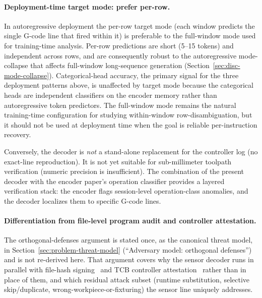 \documentclass[sensors,article,submit,moreauthors,pdftex]{Definitions/mdpi}
\begin{document}
\paragraph{Deployment-time target mode: prefer per-row.} In autoregressive deployment the per-row target mode (each window predicts the single G-code line that fired within it) is preferable to the full-window mode used for training-time analysis. Per-row predictions are short (5--15 tokens) and independent across rows, and are consequently robust to the autoregressive mode-collapse that affects full-window long-sequence generation (Section~\ref{sec:disc-mode-collapse}). Categorical-head accuracy, the primary signal for the three deployment patterns above, is unaffected by target mode because the categorical heads are independent classifiers on the encoder memory rather than autoregressive token predictors. The full-window mode remains the natural training-time configuration for studying within-window row-disambiguation, but it should not be used at deployment time when the goal is reliable per-instruction recovery.

Conversely, the decoder is \emph{not} a stand-alone replacement for the controller log (no exact-line reproduction). It is not yet suitable for sub-millimeter toolpath verification (numeric precision is insufficient). The combination of the present decoder with the encoder paper's operation classifier provides a layered verification stack: the encoder flags session-level operation-class anomalies, and the decoder localizes them to specific G-code lines.

\paragraph{Differentiation from file-level program audit and controller attestation.} The orthogonal-defenses argument is stated once, as the canonical threat model, in Section~\ref{sec:problem-threat-model} (``Adversary model: orthogonal defenses'') and is not re-derived here. That argument covers why the sensor decoder runs in parallel with file-hash signing~\cite{wells2014cyber,nist2024fmnet,belikovetsky2017drowned} and TCB controller attestation~\cite{zonouz2014plc} rather than in place of them, and which residual attack subset (runtime substitution, selective skip/duplicate, wrong-workpiece-or-fixturing) the sensor line uniquely addresses.
\end{document}

